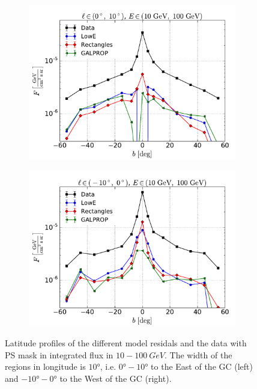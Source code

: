 \begin{figure}[h]
    \begin{subfigure}{0.5\textwidth}
        \includegraphics[width=\textwidth]{plots/Profiles_l=1_source_range_1.pdf}
    \end{subfigure} 
    \begin{subfigure}{0.5\textwidth}
        \includegraphics[width=\textwidth]{plots/Profiles_l=0_source_range_1.pdf}
    \end{subfigure}
    
  	\caption{Latitude profiles of the different model residals and the data with PS mask in integrated flux in $10 - \SI{100}{GeV}$. The width of the regions in longitude is $\ang{10}$, i.e. $\ang{0} - \ang{10}$ to the East of the GC (left) and $\ang{-10} - \ang{0}$ to the West of the GC (right).}
  	\label{fig:Profiles}
\end{figure}

